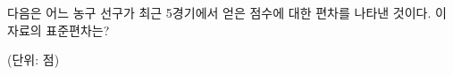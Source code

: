 다음은 어느 농구 선구가 최근 5경기에서 얻은 점수에 대한 편차를 나타낸 것이다. 이 자료의 표준편차는?\par\noindent\hfill{\footnotesize (단위: 점)}
